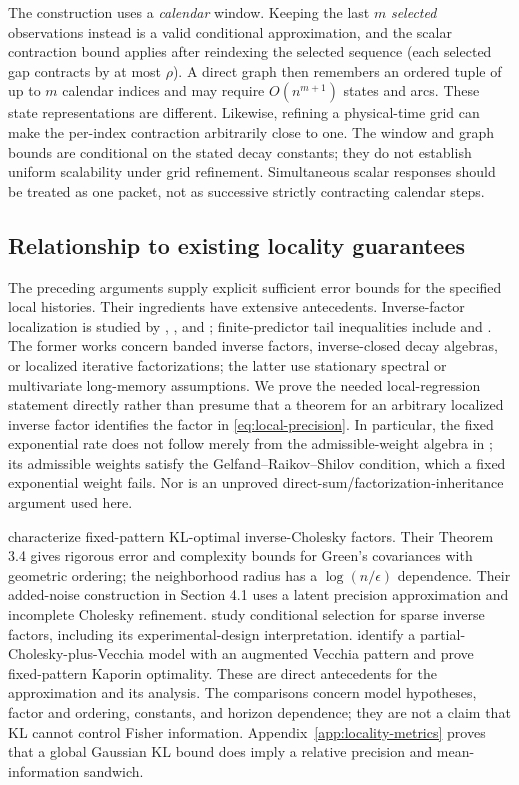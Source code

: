 The construction uses a \emph{calendar} window. Keeping the last $m$
\emph{selected} observations instead is a valid conditional approximation,
and the scalar contraction bound applies after reindexing the selected
sequence (each selected gap contracts by at most $\rho$). A direct graph
then remembers an ordered tuple of up to $m$ calendar indices and may require
$O(n^{m+1})$ states and arcs. These state representations are different.
Likewise, refining a physical-time grid can make the per-index contraction
arbitrarily close to one. The window and graph bounds are conditional on
the stated decay constants; they do not establish uniform scalability under
grid refinement. Simultaneous scalar responses should be treated as one
packet, not as successive strictly contracting calendar steps.

\subsection{Relationship to existing locality guarantees}
\label{subsec:locality-prior}
The preceding arguments supply explicit sufficient error bounds for the
specified local histories. Their ingredients have extensive antecedents.
Inverse-factor localization is studied by \citet{BenziTuma2000},
\citet{Krishtal2015}, and \citet{Rubensson2021}; finite-predictor tail
inequalities include \citet{Meyer2015} and \citet{Inoue2018}.
The former works concern banded inverse factors, inverse-closed decay
algebras, or localized iterative factorizations; the latter use stationary
spectral or multivariate long-memory assumptions. We prove the needed
local-regression statement directly rather than presume that a theorem for
an arbitrary localized inverse factor identifies the factor in
\eqref{eq:local-precision}. In particular, the fixed exponential rate does
not follow merely from the admissible-weight algebra in
\citet[Corollary 5.1]{Krishtal2015}; its admissible weights satisfy the
Gelfand--Raikov--Shilov condition, which a fixed exponential weight fails.
Nor is an unproved direct-sum/factorization-inheritance argument used here.

\citet[Theorem 2.1]{Schafer2021} characterize fixed-pattern KL-optimal
inverse-Cholesky factors. Their Theorem 3.4 gives rigorous error and complexity
bounds for Green's covariances with geometric ordering; the neighborhood
radius has a $\log(n/\epsilon)$ dependence. Their added-noise construction
in Section 4.1 uses a latent precision approximation and incomplete Cholesky
refinement. \citet{Huan2025} study conditional selection for sparse inverse
factors, including its experimental-design interpretation.
\citet{KaminetzWebber2026} identify a partial-Cholesky-plus-Vecchia model
with an augmented Vecchia pattern and prove fixed-pattern Kaporin optimality.
These are direct antecedents for the approximation and its analysis.
The comparisons concern model hypotheses, factor and ordering, constants,
and horizon dependence; they are not a claim that KL cannot control Fisher
information. Appendix~\ref{app:locality-metrics} proves that a global Gaussian
KL bound does imply a relative precision and mean-information sandwich.

